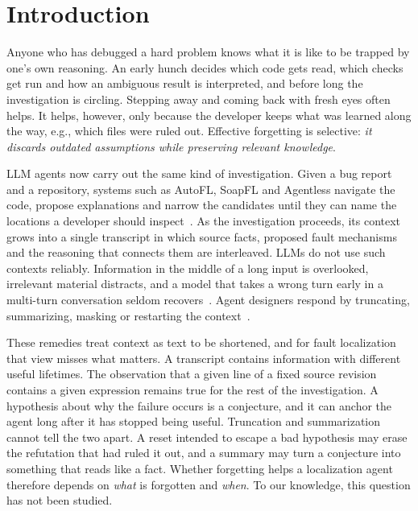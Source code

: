 \documentclass[a4paper,fleqn]{cas-sc}
\begin{document}
\section{Introduction}\label{sec:intro}
Anyone who has debugged a hard problem knows what it is like to be trapped by one's own reasoning. An early hunch decides which code gets read, which checks get run and how an ambiguous result is interpreted, and before long the investigation is circling. Stepping away and coming back with fresh eyes often helps. It helps, however, only because the developer keeps what was learned along the way, e.g., which files were ruled out. Effective forgetting is selective: \textit{it discards outdated assumptions while preserving relevant knowledge}.

LLM agents now carry out the same kind of investigation. Given a bug report and a repository, systems such as AutoFL, SoapFL and Agentless navigate the code, propose explanations and narrow the candidates until they can name the locations a developer should inspect~\citep{autofl2024,soapfl2025,agentless2025}. As the investigation proceeds, its context grows into a single transcript in which source facts, proposed fault mechanisms and the reasoning that connects them are interleaved. LLMs do not use such contexts reliably. Information in the middle of a long input is overlooked, irrelevant material distracts, and a model that takes a wrong turn early in a multi-turn conversation seldom recovers~\citep{lostmiddle2024,distract2023,multiturn2025,contextrot2025}. Agent designers respond by truncating, summarizing, masking or restarting the context~\citep{memgpt2024,sweagent2024,complexitytrap2025,forgetting2026}.

These remedies treat context as text to be shortened, and for fault localization that view misses what matters. A transcript contains information with different useful lifetimes. The observation that a given line of a fixed source revision contains a given expression remains true for the rest of the investigation. A hypothesis about why the failure occurs is a conjecture, and it can anchor the agent long after it has stopped being useful. Truncation and summarization cannot tell the two apart. A reset intended to escape a bad hypothesis may erase the refutation that had ruled it out, and a summary may turn a conjecture into something that reads like a fact. Whether forgetting helps a localization agent therefore depends on \emph{what} is forgotten and \emph{when}. To our knowledge, this question has not been studied.
\end{document}
